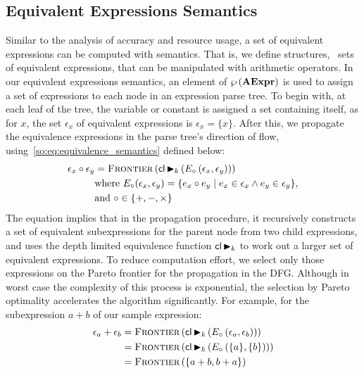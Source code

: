 \subsection{Equivalent Expressions Semantics}

Similar to the analysis of accuracy and resource usage, a set of equivalent
expressions can be computed with semantics. That is, we define structures,
\ie~sets of equivalent expressions, that can be manipulated with arithmetic
operators. In our equivalent expressions semantics, an element of
$\wp\left({\mathbf{AExpr}}\right)$ is used to assign a set of expressions to each node
in an expression parse tree. To begin with, at each leaf of the tree, the
variable or constant is assigned a set containing itself, as for $x$, the set
$\epsilon_x$ of equivalent expressions is $\epsilon_x = \{x\}$. After this, we
propagate the equivalence expressions in the parse tree's direction of flow,
using~\eqref{so:eq:equivalence_semantics} defined below:
\begin{equation}
    \begin{aligned}
        \epsilon_x \circ \epsilon_y &= \operatorname{\textsc{Frontier}}\left(
            \mathsf{cl} \operatorname{\blacktriangleright}_k \left(
                E_\circ \left( \epsilon_x, \epsilon_y \right)
            \right) \right) \\
        & \text{where~}
        E_\circ(\epsilon_x, \epsilon_y) = \{
            e_x \circ e_y \mid e_x \in \epsilon_x \wedge e_y \in \epsilon_y
        \}, \\
        & \text{and~} \circ\in\{+, -, \times\}
    \end{aligned}
    \label{so:eq:equivalence_semantics}
\end{equation}
The equation implies that in the propagation procedure, it recursively
constructs a set of equivalent subexpressions for the parent node from two
child expressions, and uses the depth limited equivalence function $\mathsf{cl}
\operatorname{\blacktriangleright}_k$ to work out a larger set of equivalent expressions. To reduce
computation effort, we select only those expressions on the Pareto frontier
for the propagation in the DFG\@. Although in worst case the complexity of
this process is exponential, the selection by Pareto optimality accelerates
the algorithm significantly. For example, for the subexpression $a + b$ of our
sample expression:
\begin{equation}
    \begin{aligned}
        \epsilon_a + \epsilon_b
            &= \operatorname{\textsc{Frontier}}\left(
                    \mathsf{cl} \operatorname{\blacktriangleright}_k \left(
                        E_\circ \left( \epsilon_a, \epsilon_b \right)
                    \right)
                \right) \\
            &= \operatorname{\textsc{Frontier}}\left(
                    \mathsf{cl} \operatorname{\blacktriangleright}_k \left(
                        E_\circ \left( \{a\}, \{b\} \right)
                    \right)
                \right) \\
            &= \operatorname{\textsc{Frontier}}\left(
                    \{ a + b, b + a \}
                \right)
    \end{aligned}
\end{equation}
